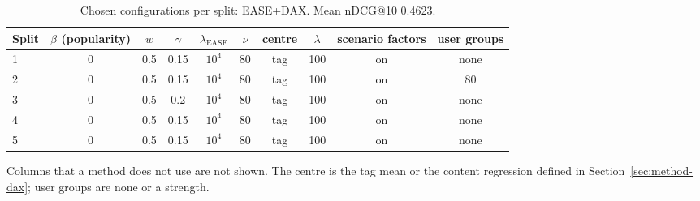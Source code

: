 \begin{table}[tbp]
\centering
\footnotesize
\caption{Chosen configurations per split: EASE+DAX. Mean nDCG@10 0.4623.}
\label{tab:grid05}
\begin{adjustbox}{max width=\linewidth}
\begin{tabular}{lccccccccc}
\toprule
Split & $\beta$ (popularity) & $w$ & $\gamma$ & $\lambda_{\mathrm{EASE}}$ & $\nu$ & centre & $\lambda$ & scenario factors & user groups \\
\midrule
1 & 0 & 0.5 & 0.15 & $10^{4}$ & 80 & tag & 100 & on & none \\
2 & 0 & 0.5 & 0.15 & $10^{4}$ & 80 & tag & 100 & on & 80 \\
3 & 0 & 0.5 & 0.2 & $10^{4}$ & 80 & tag & 100 & on & none \\
4 & 0 & 0.5 & 0.15 & $10^{4}$ & 80 & tag & 100 & on & none \\
5 & 0 & 0.5 & 0.15 & $10^{4}$ & 80 & tag & 100 & on & none \\
\bottomrule
\end{tabular}
\end{adjustbox}
\par\smallskip
\begin{minipage}{\linewidth}\raggedright\footnotesize Columns that a method does not use are not shown. The centre is the tag mean or the content regression defined in Section~\ref{sec:method-dax}; user groups are none or a strength.\end{minipage}
\end{table}

